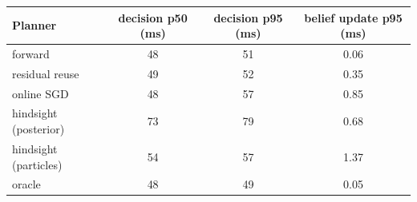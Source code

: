 \begin{tabular}{lccc}
\toprule
Planner & decision p50 (ms) & decision p95 (ms) & belief update p95 (ms) \\
\midrule
forward & 48 & 51 & 0.06 \\
residual reuse & 49 & 52 & 0.35 \\
online SGD & 48 & 57 & 0.85 \\
hindsight (posterior) & 73 & 79 & 0.68 \\
hindsight (particles) & 54 & 57 & 1.37 \\
oracle & 48 & 49 & 0.05 \\
\bottomrule
\end{tabular}
